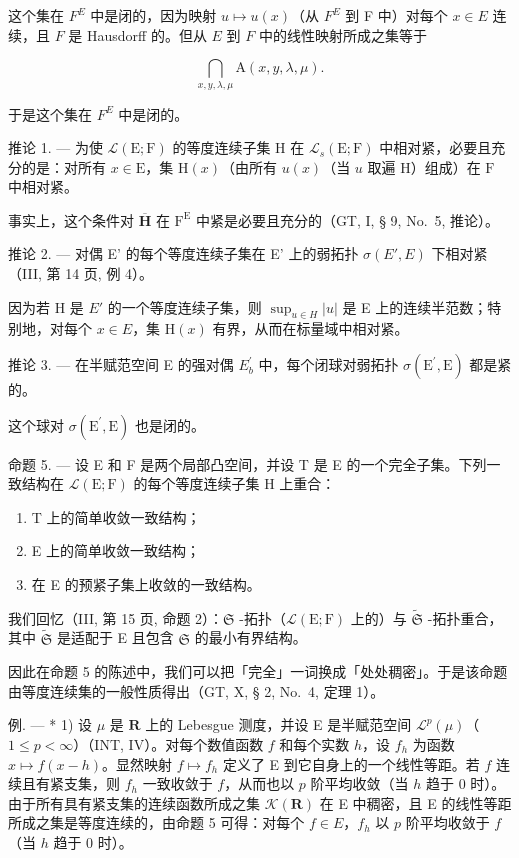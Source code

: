 这个集在 \(F^{E}\) 中是闭的，因为映射 \(u \mapsto u(x)\)（从 \(F^{E}\) 到 F 中）对每个 \(x \in E\) 连续，且 \(F\) 是 Hausdorff 的。但从 \(E\) 到 \(F\) 中的线性映射所成之集等于

\[
\bigcap_ {x, y, \lambda , \mu} \mathrm{A} (x, y, \lambda , \mu).
\]

于是这个集在 \(F^{E}\) 中是闭的。

推论 1. --- 为使 \(\mathcal{L}(\mathrm{E};\mathrm{F})\) 的等度连续子集 H 在 \(\mathcal{L}_s(\mathrm{E};\mathrm{F})\) 中相对紧，必要且充分的是：对所有 \(x\in \mathrm{E}\)，集 \(\mathrm{H}(x)\)（由所有 \(u(x)\)（当 \(u\) 取遍 \(\mathrm{H}\)）组成）在 \(\mathrm{F}\) 中相对紧。

事实上，这个条件对 \(\overline{\mathbf{H}}\) 在 \(\mathrm{F}^{\mathrm{E}}\) 中紧是必要且充分的（GT, I, § 9, No.~5, 推论）。

推论 2. --- 对偶 E' 的每个等度连续子集在 E' 上的弱拓扑 \(\sigma(E', E)\) 下相对紧（III, 第 14 页, 例 4）。

因为若 H 是 \(E'\) 的一个等度连续子集，则 \(\sup_{u\in H}|u|\) 是 E 上的连续半范数；特别地，对每个 \(x\in E\)，集 \(\mathrm{H}(x)\) 有界，从而在标量域中相对紧。

推论 3. --- 在半赋范空间 E 的强对偶 \(E_{b}^{\prime}\) 中，每个闭球对弱拓扑 \(\sigma(\mathrm{E}^{\prime},\mathrm{E})\) 都是紧的。

这个球对 \(\sigma(\mathrm{E}^{\prime},\mathrm{E})\) 也是闭的。

命题 5. --- 设 E 和 F 是两个局部凸空间，并设 T 是 E 的一个完全子集。下列一致结构在 \(\mathcal{L}(\mathrm{E};\mathrm{F})\) 的每个等度连续子集 H 上重合：

\begin{enumerate}
\def\labelenumi{\arabic{enumi})}
\item
  T 上的简单收敛一致结构；
\item
  E 上的简单收敛一致结构；
\item
  在 E 的预紧子集上收敛的一致结构。
\end{enumerate}

我们回忆（III, 第 15 页, 命题 2）：\(\mathfrak{S}\) -拓扑（\(\mathcal{L}(\mathrm{E};\mathrm{F})\) 上的）与 \(\tilde{\mathfrak{S}}\) -拓扑重合，其中 \(\tilde{\mathfrak{S}}\) 是适配于 E 且包含 \(\mathfrak{S}\) 的最小有界结构。

因此在命题 5 的陈述中，我们可以把「完全」一词换成「处处稠密」。于是该命题由等度连续集的一般性质得出（GT, X, § 2, No.~4, 定理 1）。

例. --- * 1) 设 \(\mu\) 是 \(\mathbf{R}\) 上的 Lebesgue 测度，并设 E 是半赋范空间 \(\mathcal{L}^p(\mu)\)（\(1 \leqslant p < \infty\)）（INT, IV）。对每个数值函数 \(f\) 和每个实数 \(h\)，设 \(f_h\) 为函数 \(x \mapsto f(x - h)\)。显然映射 \(f \mapsto f_h\) 定义了 E 到它自身上的一个线性等距。若 \(f\) 连续且有紧支集，则 \(f_h\) 一致收敛于 \(f\)，从而也以 \(p\) 阶平均收敛（当 \(h\) 趋于 0 时）。由于所有具有紧支集的连续函数所成之集 \(\mathcal{K}(\mathbf{R})\) 在 E 中稠密，且 E 的线性等距所成之集是等度连续的，由命题 5 可得：对每个 \(f \in E\)，\(f_h\) 以 \(p\) 阶平均收敛于 \(f\)（当 \(h\) 趋于 0 时）。


